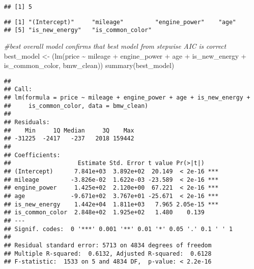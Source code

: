 \documentclass[
]{article}
\newenvironment{Shaded}{\begin{snugshade}}{\end{snugshade}}
\newcommand{\CommentTok}[1]{\textcolor[rgb]{0.56,0.35,0.01}{\textit{#1}}}
\newcommand{\FunctionTok}[1]{\textcolor[rgb]{0.00,0.00,0.00}{#1}}
\newcommand{\NormalTok}[1]{#1}
\newcommand{\OtherTok}[1]{\textcolor[rgb]{0.56,0.35,0.01}{#1}}
\newcommand{\SpecialCharTok}[1]{\textcolor[rgb]{0.00,0.00,0.00}{#1}}
\begin{document}
\begin{verbatim}
## [1] 5
\end{verbatim}

\begin{Shaded}
\end{Shaded}

\begin{verbatim}
## [1] "(Intercept)"     "mileage"         "engine_power"    "age"            
## [5] "is_new_energy"   "is_common_color"
\end{verbatim}

\begin{Shaded}
\begin{Highlighting}[]
\CommentTok{\#best overall model confirms that best model from stepwise AIC is correct}
\NormalTok{best\_model }\OtherTok{\textless{}{-}}\NormalTok{ (}\FunctionTok{lm}\NormalTok{(price }\SpecialCharTok{\textasciitilde{}}\NormalTok{ mileage }\SpecialCharTok{+}\NormalTok{ engine\_power }\SpecialCharTok{+}\NormalTok{ age }\SpecialCharTok{+}\NormalTok{ is\_new\_energy }\SpecialCharTok{+}\NormalTok{ is\_common\_color, bmw\_clean))}
\FunctionTok{summary}\NormalTok{(best\_model)}
\end{Highlighting}
\end{Shaded}

\begin{verbatim}
## 
## Call:
## lm(formula = price ~ mileage + engine_power + age + is_new_energy + 
##     is_common_color, data = bmw_clean)
## 
## Residuals:
##    Min     1Q Median     3Q    Max 
## -31225  -2417   -237   2018 159442 
## 
## Coefficients:
##                   Estimate Std. Error t value Pr(>|t|)    
## (Intercept)      7.841e+03  3.892e+02  20.149  < 2e-16 ***
## mileage         -3.826e-02  1.622e-03 -23.589  < 2e-16 ***
## engine_power     1.425e+02  2.120e+00  67.221  < 2e-16 ***
## age             -9.671e+02  3.767e+01 -25.671  < 2e-16 ***
## is_new_energy    1.442e+04  1.811e+03   7.965 2.05e-15 ***
## is_common_color  2.848e+02  1.925e+02   1.480    0.139    
## ---
## Signif. codes:  0 '***' 0.001 '**' 0.01 '*' 0.05 '.' 0.1 ' ' 1
## 
## Residual standard error: 5713 on 4834 degrees of freedom
## Multiple R-squared:  0.6132, Adjusted R-squared:  0.6128 
## F-statistic:  1533 on 5 and 4834 DF,  p-value: < 2.2e-16
\end{verbatim}
\end{document}
